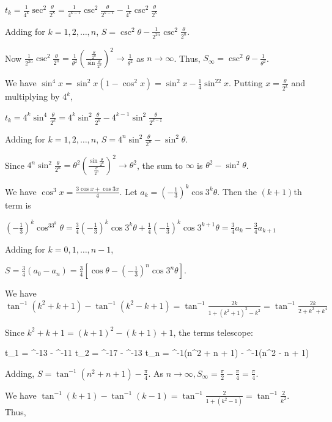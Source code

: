   $t_k = \frac{1}{4^k}\sec^2\frac{\theta}{2^k} = \frac{1}{4^{k - 1}}\csc^2\frac{\theta}{2^{k - 1}} -
  \frac{1}{4^k}\csc^2\frac{\theta}{2^k}$

  Adding for $k = 1, 2, \ldots, n$, $S = \csc^2\theta - \frac{1}{2^{2n}}\csc^2\frac{\theta}{2^n}$.

  Now $\frac{1}{2^{2n}}\csc^2\frac{\theta}{2^n} = \frac{1}{\theta^2}\left(\frac{\frac{\theta}{2^n}}{\sin
    \frac{\theta}{2^n}}\right)^2 \to \frac{1}{\theta^2}$ as $n \to \infty$. Thus, $S_\infty = \csc^2\theta -
  \frac{1}{\theta^2}$.
\item We have $\sin^4x = \sin^2x(1 - \cos^2x) = \sin^2x - \frac{1}{4}\sin^22x$. Putting $x =
  \frac{\theta}{2^k}$ and multiplying by $4^k$,

  $t_k = 4^k\sin^4\frac{\theta}{2^k} = 4^k\sin^2\frac{\theta}{2^k} - 4^{k - 1}\sin^2\frac{\theta}{2^{k - 1}}$

  Adding for $k = 1, 2, \ldots, n$, $S = 4^n\sin^2\frac{\theta}{2^n} - \sin^2\theta$.

  Since $4^n\sin^2\frac{\theta}{2^n} = \theta^2\left(\frac{\sin\frac{\theta}{2^n}}{\frac{\theta}{2^n}}\right)^2
  \to \theta^2$, the sum to $\infty$ is $\theta^2 - \sin^2\theta$.
\item We have $\cos^3x = \frac{3\cos x + \cos3x}{4}$. Let $a_k = \left(-\frac{1}{3}\right)^k\cos3^k\theta$.
  Then the $(k + 1)$th term is

  $\left(-\frac{1}{3}\right)^k\cos^33^k\theta = \frac{3}{4}\left(-\frac{1}{3}\right)^k\cos3^k\theta +
  \frac{1}{4}\left(-\frac{1}{3}\right)^k\cos3^{k + 1}\theta = \frac{3}{4}a_k - \frac{3}{4}a_{k + 1}$

  Adding for $k = 0, 1, \ldots, n - 1$,

  $S = \frac{3}{4}(a_0 - a_n) = \frac{3}{4}\left[\cos\theta - \left(-\frac{1}{3}\right)^n\cos3^n\theta\right]$.
\item We have $\tan^{-1}(k^2 + k + 1) - \tan^{-1}(k^2 - k + 1) = \tan^{-1}\frac{2k}{1 + (k^2 + 1)^2 - k^2}
  = \tan^{-1}\frac{2k}{2 + k^2 + k^4}$

  Since $k^2 + k + 1 = (k + 1)^2 - (k + 1) + 1$, the terms telescope:

  \startformula\startalign
    \NC t_1 \NC = \tan^{-1}3 - \tan^{-1}1\NR
    \NC t_2 \NC = \tan^{-1}7 - \tan^{-1}3\NR
    \NC \NC \cdots\NR
    \NC t_n \NC = \tan^{-1}(n^2 + n + 1) - \tan^{-1}(n^2 - n + 1)\NR
  \stopalign\stopformula

  Adding, $S = \tan^{-1}(n^2 + n + 1) - \frac{\pi}{4}$. As $n \to \infty, S_\infty = \frac{\pi}{2} -
  \frac{\pi}{4} = \frac{\pi}{4}$.
\item We have $\tan^{-1}(k + 1) - \tan^{-1}(k - 1) = \tan^{-1}\frac{2}{1 + (k^2 - 1)} =
  \tan^{-1}\frac{2}{k^2}$. Thus,


